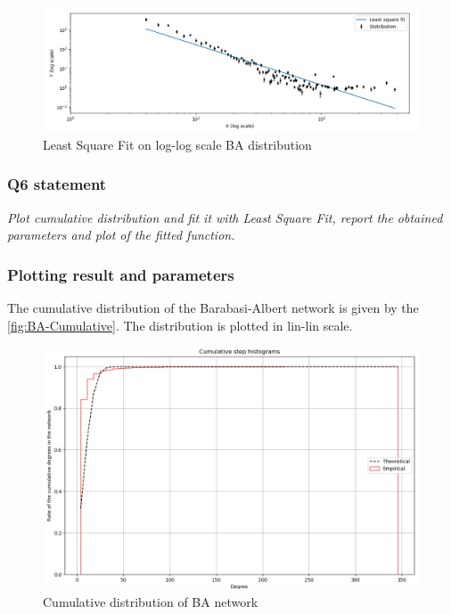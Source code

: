 \documentclass{article}
\begin{document}
\begin{figure}[h]
  \centering
  \includegraphics[scale=0.5]{fig/BA-LSF.png}
  \caption{Least Square Fit on log-log scale BA distribution}
  \label{fig:BA-LSF}
\end{figure} 

\newpage
\subsubsection{Q6 statement}
\textit{Plot cumulative distribution and fit it with Least Square Fit, report the obtained parameters and plot of the fitted function.}

\subsubsection*{Plotting result and parameters} 
The cumulative distribution of the Barabasi-Albert network is given by the \autoref{fig:BA-Cumulative}. The distribution is plotted in lin-lin scale. 


\begin{figure}[h]
  \centering
  \includegraphics[scale=0.4]{fig/BA-Cumulative.png}
  \caption{Cumulative distribution of BA network}
  \label{fig:BA-Cumulative}
\end{figure}
\end{document}
